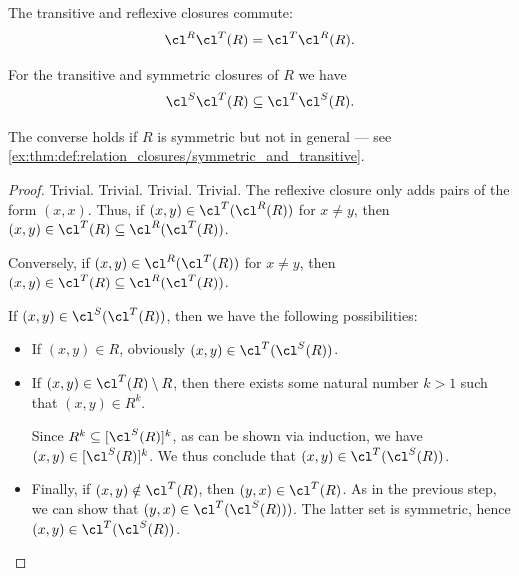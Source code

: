 \begin{comments}
\begin{proposition}
\begin{thmenum}
     The transitive and reflexive closures commute:
    \begin{equation}\label{eq:thm:def:relation_closures/reflexive_and_transitive}
      \cl^R \cl^T(R) = \cl^T \cl^R(R).
    \end{equation}

     For the transitive and symmetric closures of \( R \) we have
    \begin{equation}\label{eq:thm:def:relation_closures/symmetric_and_transitive}
      \cl^S \cl^T(R) \subseteq \cl^T \cl^S(R).
    \end{equation}

    The converse holds if \( R \) is symmetric but not in general --- see \cref{ex:thm:def:relation_closures/symmetric_and_transitive}.
  \end{thmenum}
\end{proposition}
\begin{proof}
   Trivial.
   Trivial.
   Trivial.
   Trivial.
   The reflexive closure only adds pairs of the form \( (x, x) \). Thus, if \( (x, y) \in \cl^T(\cl^R(R)) \) for \( x \neq y \), then \( (x, y) \in \cl^T(R) \subseteq \cl^R(\cl^T(R)) \).

  Conversely, if \( (x, y) \in \cl^R(\cl^T(R)) \) for \( x \neq y \), then \( (x, y) \in \cl^T(R) \subseteq \cl^R(\cl^T(R)) \).

   If \( (x, y) \in \cl^S(\cl^T(R)) \), then we have the following possibilities:
  \begin{itemize}
    \item If \( (x, y) \in R \), obviously \( (x, y) \in \cl^T(\cl^S(R)) \).
    \item If \( (x, y) \in \cl^T(R) \setminus R \), then there exists some natural number \( k > 1 \) such that \( (x, y) \in R^k \).

    Since \( R^k \subseteq [\cl^S(R)]^k \), as can be shown via induction, we have \( (x, y) \in [\cl^S(R)]^k \). We thus conclude that \( (x, y) \in \cl^T(\cl^S(R)) \).

    \item Finally, if \( (x, y) \notin \cl^T(R) \), then \( (y, x) \in \cl^T(R) \). As in the previous step, we can show that \( (y, x) \in \cl^T(\cl^S(R))) \). The latter set is symmetric, hence \( (x, y) \in \cl^T(\cl^S(R)) \).
  \end{itemize}


\end{proof}
\end{comments}
